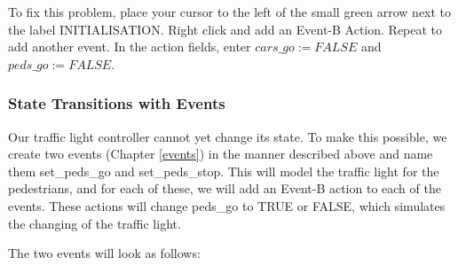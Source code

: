 To fix this problem, place your cursor to the left of the small green arrow next to the label \textsf{INITIALISATION}. Right click and add an \textsf{Event-B Action}. Repeat to add another event. In the action fields, enter $cars\_go :=  FALSE$ and $peds\_go :=  FALSE$.



\subsubsection{State Transitions with Events}

Our traffic light controller cannot yet change its state.  To make this possible, we create two events (Chapter \ref{events}) in the manner described above and name them \textsf{set\_peds\_go} and \textsf{set\_peds\_stop}. This will model the traffic light for the pedestrians, and for each of these, we will add an Event-B action to each of the events. These actions will change \textsf{peds\_go} to \textsf{TRUE} or \textsf{FALSE}, which simulates the changing of the traffic light.


The two events will look as follows:


